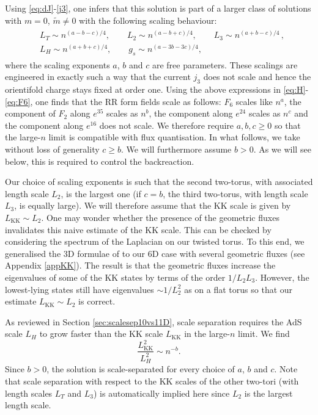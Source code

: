 \documentclass[11pt]{article}
\newcommand{\be}{\begin{equation}}
\newcommand{\ee}{\end{equation}}
\def\be{\begin{equation}}
\def\ee{\end{equation}}
\renewcommand{\[}{\left[}
\renewcommand{\]}{\right]}
\renewcommand{\(}{\left(}
\renewcommand{\)}{\right)}
\newcommand{\<}{\langle}
\renewcommand{\>}{\rangle}
\begin{document}
Using \eqref{eq:dJ}-\eqref{j3}, one infers that this solution is part of a larger class of solutions with $m=0$, $\tilde{m}\neq 0$ with the following scaling behaviour:
\begin{align}
\label{eq:general_scalings}
\begin{split}
    &L_T \sim n^{(a-b-c)/4}, \qquad L_2 \sim n^{(a-b+c)/4}, \qquad L_3 \sim n^{(a+b-c)/4}\,,\\
    & L_H \sim n^{(a+b+c)/4}, \qquad g_s \sim n^{(a -3b - 3c)/4},
\end{split}
\end{align}
where the scaling exponents $a$, $b$ and $c$ are free parameters.
These scalings are engineered in exactly such a way that the current $j_3$ does not scale and hence the orientifold charge stays fixed at order one.
Using the above expressions in \eqref{eq:H}-\eqref{eq:F6}, one finds that the RR form fields scale as follows: $F_6$ scales like $n^a$, the component of $F_2$ along $e^{35}$ scales as $n^b$, the component along $e^{24}$ scales as $n^c$ and the component along $e^{16}$ does not scale.
We therefore require $a,b,c\ge 0$ so that the large-$n$ limit is compatible with flux quantisation. In what follows, we take without loss of generality $c \geq b$. We will furthermore assume $b>0$. As we will see below, this is required to control the backreaction.

Our choice of scaling exponents is such that the second two-torus, with associated length scale $L_2$, is the largest one (if $c=b$, the third two-torus, with length scale $L_3$, is equally large).
We will therefore assume that the KK scale is given by $L_\text{KK} \sim L_2$. One may wonder whether the presence of the geometric fluxes invalidates this naive estimate of the KK scale. This can be checked by considering the spectrum of the Laplacian on our twisted torus. To this end, we generalised the 3D formulae of \cite{Andriot:2016rdd} to our 6D case with several geometric fluxes (see Appendix \ref{appKK}). The result is that the geometric fluxes increase the eigenvalues of some of the KK states by terms of the order $1/L_2L_3$. However, the lowest-lying states still have eigenvalues $\sim 1/L_2^2$ as on a flat torus so that our  estimate $L_\text{KK} \sim L_2$ is correct.

As reviewed in Section \ref{sec:scalesep10vs11D}, scale separation requires the AdS scale $L_H$ to grow faster than the KK scale $L_\text{KK}$ in the large-$n$ limit. We find
\be
    \frac{L^2_\text{KK}}{L^2_H} \sim n^{-b}.
\ee
Since $b>0$, the solution is scale-separated for every choice of $a$, $b$ and $c$.
Note that scale separation with respect to the KK scales of the other two-tori (with length scales $L_T$ and $L_3$) is automatically implied here since $L_2$ is the largest length scale.
\end{document}
